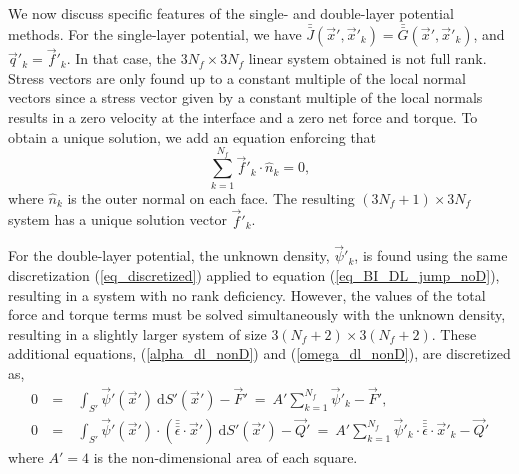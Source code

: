  \par
 We now discuss specific features of the single- and double-layer potential methods. For the single-layer potential, we have $\bar{\bar{J}}(\vec{x}',\vec{x}'_k) = \bar{\bar{G}}(\vec{x}',\vec{x}'_k)$, and $\vec{q}'_k = \vec{f}'_k$. 
 In that case, the $3N_f \times 3N_f$ linear system obtained is not full rank. Stress vectors are only found up to a constant multiple of the local normal vectors since a stress vector given by a constant multiple of the local normals results in a zero velocity at the interface and a zero net force and torque. To obtain a unique solution, we add an equation enforcing that
 \begin{equation}
 \sum_{k=1}^{N_f} \vec{f}'_k \cdot \hat{n}_k = 0,
 \label{eq_constraint}
 \end{equation}
 where $\hat{n}_k$ is the outer normal on each face. The resulting $(3N_f +1)\times 3N_f$ system has a unique solution vector $\vec{f}'_k$. 
 \par
 For the double-layer potential, the unknown density, $\vec{\psi}'_k$, is found using the same discretization (\ref{eq_discretized}) applied to equation (\ref{eq_BI_DL_jump_noD}), resulting in a system with no rank deficiency. However, the values of the total force and torque terms must be solved simultaneously with the unknown density, resulting in a slightly larger system of size $3(N_f+2)\times 3(N_f+2)$. These additional  equations, (\ref{alpha_dl_nonD}) and (\ref{omega_dl_nonD}), are discretized as,
 \begin{eqnarray}
 0 \ &=& \
 \int_{S'}  \vec{\psi}'( \vec{x}')  \ \text{d}S'(\vec{x}') -  \vec{F}' \ = \
A' \sum_{k=1}^{N_f} \vec{\psi}'_k   -  \vec{F}', \label{eq_disc_dlF} \\
0 \ &=& \
  \int_{S'}  \vec{\psi}' ( \vec{x}') \cdot  (\bar{\bar{\bar{\epsilon}}} \cdot \vec{x}' )  \ \text{d}S'(\vec{x}')
 - \vec{Q}'
\ = \
 A' \sum_{k=1}^{N_f} \vec{\psi}'_k   \cdot \bar{\bar{\bar{\epsilon}}}  \cdot  \vec{x}'_k   - \vec{Q}' \label{eq_disc_dlQ}
 \end{eqnarray}
where $A' = 4$ is the non-dimensional area of each square.
